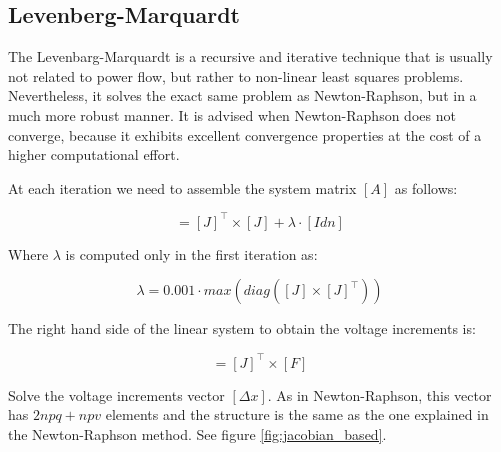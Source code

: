 \documentclass[nols,a4paper,twoside,notoc,fleqn]{tufte-book}
\begin{document}
\newpage
\subsection{Levenberg-Marquardt} \label{LM-Method}

The Levenbarg-Marquardt is a recursive and iterative technique that is usually not related to power flow, but rather to non-linear least squares problems. Nevertheless, it solves the exact same problem as Newton-Raphson, but in a much more robust manner. It is advised when Newton-Raphson does not converge, because it exhibits excellent convergence properties at the cost of a higher computational effort.


At each iteration we need to assemble the system matrix $[A]$ as follows:
%
%
%


\begin{equation}
[A] = [J]^\top \times [J] + \lambda \cdot [Idn]
\label{eq:lm_A}
\end{equation}


Where $\lambda$ is computed only in the first iteration as:

\begin{equation}
\lambda = 0.001 \cdot max(diag([J] \times [J]^\top))
\end{equation}

The right hand side of the linear system to obtain the voltage increments is:


\begin{equation}
[rhs] = [J]^\top \times [F]
\label{eq:lm_rhs}
\end{equation}


Solve the voltage increments vector $[\Delta x]$. As in Newton-Raphson, this vector has $2npq+npv$ elements and the structure is the same as the one explained in the Newton-Raphson method. See figure \ref{fig:jacobian_based}.

\end{document}
